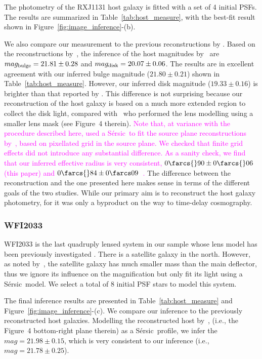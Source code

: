 \documentclass[fleqn,usenatbib]{mnras}
\newcommand{\sersic}{S\'ersic}
\newcommand{\pink}[1]{{\textcolor{magenta}{#1}}}
\begin{document}
The photometry of the RXJ1131 host galaxy is fitted with a set of 4 initial PSFs. The results are summarized in Table~\ref{tab:host_measure}, with the best-fit result shown in Figure~\ref{fig:image_inference}-(b).

We also compare our measurement to the previous reconstructions by \citet{Ding2017b}. Based on the reconstructions by~\citet{Suyu2013}, the inference of the host magnitudes by~\citet{Ding2017b} are $mag_{\rm bulge} = 21.81 \pm 0.28$ and $mag_{\rm disk} = 20.07\pm0.06$. The results are in excellent agreement with our inferred bulge magnitude ($21.80\pm0.21$)   shown in Table~\ref{tab:host_measure}. However, our inferred disk magnitude ($19.33\pm0.16$) is brighter than that reported by \citet{Ding2017b}. This difference is not surprising because our reconstruction of the host galaxy is based on a much more extended region to collect the disk light, compared with~\citet{Suyu2013} who performed the lens modelling using a smaller lens mask (see Figure~4 therein). \pink{Note that, at variance with the procedure described here, \citet{Ding2017b} used a \sersic\ to fit the source plane reconstructions by~\citet{Suyu2013}, based on pixellated grid in the source plane. We checked that finite grid effects did not introduce any substantial difference. As a sanity check, we find that our inferred effective radius is very consistent, $0\farcs{}90 \pm 0\farcs{}06$ (this paper) and $0\farcs{}84 \pm 0\farcs09$~\citep{Ding2017b}.} The difference between the \citet{Suyu2013} reconstruction and the one presented here makes sense in terms of the different goals of the two studies. While our primary aim is to reconstruct the host galaxy photometry, for \citet{Suyu2013} it was only a byproduct on the way to time-delay cosmography.

\subsubsection{WFI2033}
WFI2033 is the last quadruply lensed system in our sample whose lens model has been previously investigated \citep{Rusu2019}. There is a satellite galaxy in the north. However, as noted by~\citet{Rusu2019}, the satellite galaxy has much smaller mass than the main deflector, thus we ignore its influence on the magnification but only fit its light using a \sersic\ model. We select a total of 8 initial PSF stars to model this system.

The final inference results are presented in Table~\ref{tab:host_measure} and Figure~\ref{fig:image_inference}-(c). We compare our inference to the previously reconstructed host galaxies. Modelling the reconstructed host by~\citet{Rusu2019}, (i.e., the Figure~4 bottom-right plane therein) as a \sersic\ profile, we infer the $mag = 21.98 \pm 0.15$, which is very consistent to our inference (i.e., $mag = 21.78 \pm 0.25$).
\end{document}
